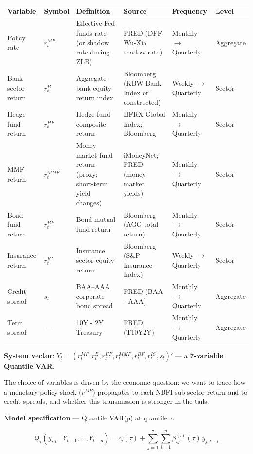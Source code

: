 \documentclass[11pt,a4paper]{article}
\begin{document}
{\small
\begin{longtable}{|p{}|p{}|p{}|p{}|p{}|p{}|}
\hline
\textbf{Variable} & \textbf{Symbol} & \textbf{Definition} & \textbf{Source} & \textbf{Frequency} & \textbf{Level} \\
\hline
\endhead
Policy rate & $r_t^{MP}$ & Effective Fed funds rate (or shadow rate during ZLB) & FRED (DFF; Wu-Xia shadow rate) & Monthly $\rightarrow$ Quarterly & Aggregate \\
\hline
Bank sector return & $r_t^{B}$ & Aggregate bank equity return index & Bloomberg (KBW Bank Index or constructed) & Weekly $\rightarrow$ Quarterly & Sector \\
\hline
Hedge fund return & $r_t^{HF}$ & Hedge fund composite return & HFRX Global Index; Bloomberg & Monthly $\rightarrow$ Quarterly & Sector \\
\hline
MMF return & $r_t^{MMF}$ & Money market fund return (proxy: short-term yield changes) & iMoneyNet; FRED (money market yields) & Monthly $\rightarrow$ Quarterly & Sector \\
\hline
Bond fund return & $r_t^{BF}$ & Bond mutual fund return & Bloomberg (AGG total return) & Monthly $\rightarrow$ Quarterly & Sector \\
\hline
Insurance return & $r_t^{IC}$ & Insurance sector equity return & Bloomberg (S\&P Insurance Index) & Weekly $\rightarrow$ Quarterly & Sector \\
\hline
Credit spread & $s_t$ & BAA--AAA corporate bond spread & FRED (BAA - AAA) & Monthly $\rightarrow$ Quarterly & Aggregate \\
\hline
Term spread & --- & 10Y - 2Y Treasury & FRED (T10Y2Y) & Monthly $\rightarrow$ Quarterly & Aggregate \\
\hline
\end{longtable}
}

\textbf{System vector}: $Y_t = (r_t^{MP}, r_t^{B}, r_t^{HF}, r_t^{MMF}, r_t^{BF}, r_t^{IC}, s_t)'$ --- a \textbf{7-variable Quantile VAR}.

The choice of variables is driven by the economic question: we want to trace how a monetary policy shock ($r^{MP}$) propagates to each NBFI sub-sector return and to credit spreads, and whether this transmission is stronger in the tails.

\textbf{Model specification} --- Quantile VAR(p) at quantile $\tau$:

\[Q_{\tau}(y_{i,t} \mid Y_{t-1}, \ldots, Y_{t-p}) = c_i(\tau) + \sum_{j=1}^{7} \sum_{l=1}^{p} \beta_{ij}^{(l)}(\tau) \, y_{j,t-l}\]
\end{document}
